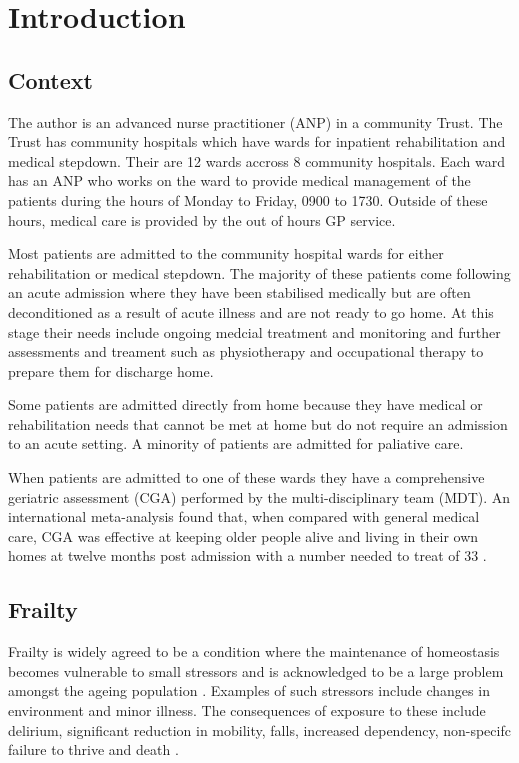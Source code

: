 \documentclass[12pt,a4paper,oneside,titlepage]{article}
\begin{document}
\author{Gregory Cartwright}
\title{}
\section*{Introduction}

\subsection*{Context}
The author is an advanced nurse practitioner (ANP) in a community Trust.
The Trust has community hospitals which have wards for inpatient rehabilitation and
medical stepdown. Their are 12 wards accross 8 community hospitals. Each ward has
an ANP who works on the ward to provide medical management of the patients during 
the hours of Monday to Friday, 0900 to 1730. Outside of these hours, medical care 
is provided by the out of hours GP service. 

Most patients are admitted to the community hospital wards for either rehabilitation
or medical stepdown. The majority of these patients come following an acute admission
where they have been stabilised medically but are often deconditioned as a result
of acute illness and are not ready to go home. At this stage their needs include 
ongoing medcial treatment and monitoring and further assessments and treament such 
as physiotherapy and occupational therapy to prepare them for discharge home.

Some patients are admitted directly from home because they have medical or rehabilitation
needs that cannot be met at home but do not require an admission to an acute setting.
A minority of patients are admitted for paliative care.

When patients are admitted to one of these wards they have a comprehensive geriatric 
assessment (CGA) \parencite{bgs:14} performed by the multi-disciplinary team (MDT).
An international meta-analysis found that, when compared with general medical care,
CGA was effective at keeping older people alive and living in their own homes at
twelve months post admission with a number needed to treat of 33 \parencite{ellis:11}.

\subsection*{Frailty}
Frailty is widely agreed to be a condition where the maintenance of homeostasis 
becomes vulnerable to 
small stressors \parencite{vellas:16} and is acknowledged to be a large problem amongst the ageing population 
\parencite{clegg:13}. Examples of such stressors include changes in environment and minor
illness. The consequences of exposure to these include delirium, significant reduction in mobility,
falls, increased dependency, non-specifc failure to thrive and death 
\parencite{bgs:14,vellas:16,oliver:14}.
\end{document}
